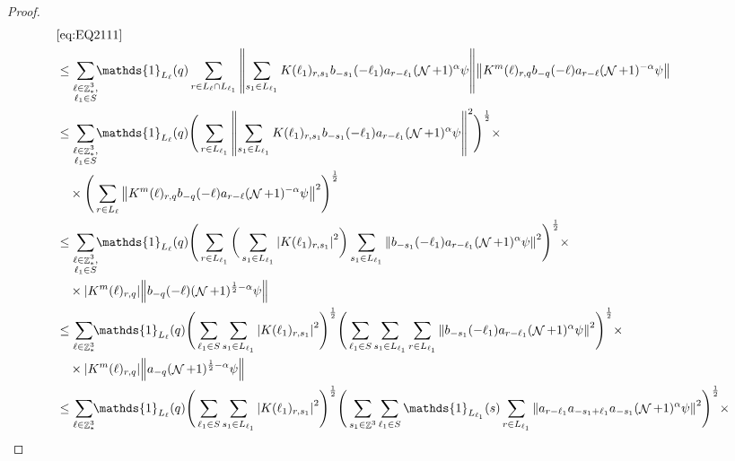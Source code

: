 \documentclass[12pt,a4paper]{article}
\numberwithin{equation}{section}
\newcommand{\1}{\mathbb{I}}
\DeclareMathOperator{\Z}{\mathbb{Z}}
\DeclareMathOperator{\NN}{\mathcal{N}}
\newcommand{\half}{\frac{1}{2}}
\theoremstyle{plain}
\theoremstyle{definition}
\theoremstyle{remark}
\theoremstyle{plain}
\theoremstyle{definition}
\theoremstyle{remark}
\begin{document}
\begin{proof}
	\begin{align}
		&\eqref{eq:EQ2111}\nonumber\\
		&\leq\sum\limits_{\substack{\ell \in \Z^3_*,\\\ell_1 \in S}} \!\!\mathds{1}_{L_\ell}(q) \sum\limits_{ r \in L_\ell \cap L_{\ell_1}}    \norm{ \sum\limits_{s_1 \in L_{\ell_1}} K(\ell_1)_{r,s_1} b_{-s_1}(-\ell_1)  a_{r-\ell_1} (\NN+1)^{\alpha}\psi}\norm{ K^{m}(\ell)_{r,q}   b_{-q}(-\ell) a_{r-\ell} (\NN+1)^{-\alpha}\psi } \nonumber\\
		&\leq \sum\limits_{\substack{\ell \in \Z^3_*,\\\ell_1 \in S}} \!\!\mathds{1}_{L_\ell}(q) \Bigg( \sum\limits_{r \in L_{\ell_1}} \norm{\sum\limits_{s_1 \in L_{\ell_1}} K(\ell_1)_{r,s_1} b_{-s_1}(-\ell_1) a_{r-\ell_1} (\NN+1)^{\alpha}\psi}^2\Bigg)^\half \times\nonumber\\
		&\quad \times \Bigg( \sum\limits_{r \in L_\ell}  \norm{  K^{m}(\ell)_{r,q}  b_{-q}(-\ell) a_{r-\ell} (\NN+1)^{-\alpha}\psi }^2\Bigg)^\half \nonumber\\
		&\leq \sum\limits_{\substack{\ell \in \Z^3_*,\\ \ell_1 \in S}} \!\!\mathds{1}_{L_\ell}(q) \Bigg( \sum\limits_{r \in L_{\ell_1}} \bigg( \sum\limits_{s_1 \in L_{\ell_1}}\abs{K(\ell_1)_{r,s_1}}^2\bigg) \sum\limits_{s_1 \in L_{\ell_1}} \norm{ b_{-s_1}(-\ell_1)  a_{r-\ell_1} (\NN+1)^{\alpha}\psi}^2\Bigg)^\half \times\nonumber\\
		&\quad \times  \abs{  K^{m}(\ell)_{r,q}} \norm{b_{-q}(-\ell) (\NN+1)^{\half-\alpha}\psi } \nonumber\\
		&\leq \sum\limits_{\ell \in \Z^3_*} \!\!\mathds{1}_{L_\ell}(q) \Bigg( \sum\limits_{ \ell_1 \in S}  \sum\limits_{s_1 \in L_{\ell_1}}\abs{K(\ell_1)_{r,s_1}}^2\Bigg)^\half \Bigg(\sum\limits_{ \ell_1 \in S}  \sum\limits_{s_1 \in L_{\ell_1}} \sum\limits_{r \in L_{\ell_1}}\norm{ b_{-s_1}(-\ell_1)  a_{r-\ell_1} (\NN+1)^{\alpha}\psi}^2\Bigg)^\half \times\nonumber\\
		&\quad \times  \abs{  K^{m}(\ell)_{r,q}} \norm{a_{-q} (\NN+1)^{\half-\alpha}\psi } \nonumber\\
		&\leq \sum\limits_{\ell \in \Z^3_*} \!\!\mathds{1}_{L_\ell}(q) \Bigg( \sum\limits_{ \ell_1 \in S}  \sum\limits_{s_1 \in L_{\ell_1}}  \abs{K(\ell_1)_{r,s_1}}^2\Bigg)^\half \Bigg(  \sum\limits_{s_1 \in \Z^3} \sum\limits_{ \ell_1 \in S} \mathds{1}_{L_{\ell_1}}(s) \sum\limits_{r \in L_{\ell_1}} \norm{ a_{r-\ell_1} a_{-s_1+\ell_1}a_{-s_1}   (\NN+1)^{\alpha}\psi}^2\Bigg)^\half \times\nonumber\\

\end{align}
\end{proof}
\end{document}
